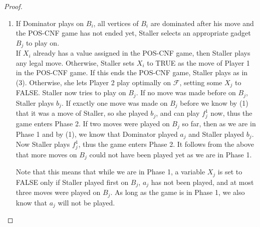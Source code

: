 \documentclass[12pt]{article}
\newcommand{\F}{\mathcal{F}}
\begin{document}
\begin{proof}
\begin{description}
\begin{enumerate}[(1)]
			\item If Dominator plays on $B_i$, all vertices of $B_i$ are dominated after his move and the POS-CNF game has not ended yet, Staller selects an appropriate gadget $B_j$ to play on.\\
			If $X_i$ already has a value assigned in the POS-CNF game, then Staller plays any legal move. Otherwise, Staller sets $X_i$ to TRUE as the move of Player 1 in the POS-CNF game. If this ends the POS-CNF game, Staller plays as in (3). Otherwise, she lets Player 2 play optimally on $\F$, setting some $X_j$ to FALSE. Staller now tries to play on $B_j$.
			If no move was made before on $B_j$, Staller plays $b_j$. If exactly one move was made on $B_j$ before we know by (1) that it was a move of Staller, so she played $b_j$, and can play $f_j^1$ now, thus the game enters Phase 2. If two moves were played on $B_j$ so far, then as we are in Phase 1 and by (1), we know that Dominator played $a_j$ and Staller played $b_j$. Now Staller plays $f_j^1$, thus the game enters Phase 2.	It follows from the above that more moves on $B_j$ could not have been played yet as we are in Phase 1.		
			
			

			Note that this means that while we are in Phase 1, a variable $X_j$ is set to FALSE only if Staller played first on $B_j$, $a_j$ has not been played, and at most three moves were played on $B_j$. As long as the game is in Phase 1, we also know that $a_j$ will not be played.
			

\end{enumerate}
\end{description}
\end{proof}
\end{document}
